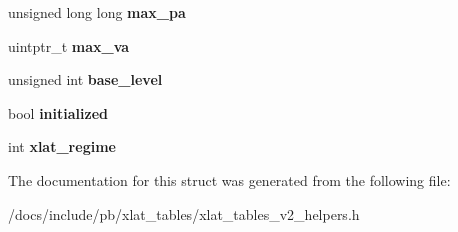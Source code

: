 \begin{DoxyCompactItemize}
\item 
\mbox{\label{structxlat__ctx_af6e2767e7b3b7e1d1eaa9f71731fe146}} 
unsigned long long {\bfseries max\+\_\+pa}
\item 
\mbox{\label{structxlat__ctx_aa6d3f314a4f453996888709fb24e803f}} 
uintptr\+\_\+t {\bfseries max\+\_\+va}
\item 
\mbox{\label{structxlat__ctx_aab6577b89067af023d0dcd08793aee2f}} 
unsigned int {\bfseries base\+\_\+level}
\item 
\mbox{\label{structxlat__ctx_a60d2b76c19f2354523c528dcfc866ccc}} 
bool {\bfseries initialized}
\item 
\mbox{\label{structxlat__ctx_aabcef47052f6fe2aa60b5d6f04bcc362}} 
int {\bfseries xlat\+\_\+regime}
\end{DoxyCompactItemize}


The documentation for this struct was generated from the following file\+:\begin{DoxyCompactItemize}
\item 
/docs/include/pb/xlat\+\_\+tables/xlat\+\_\+tables\+\_\+v2\+\_\+helpers.\+h\end{DoxyCompactItemize}
